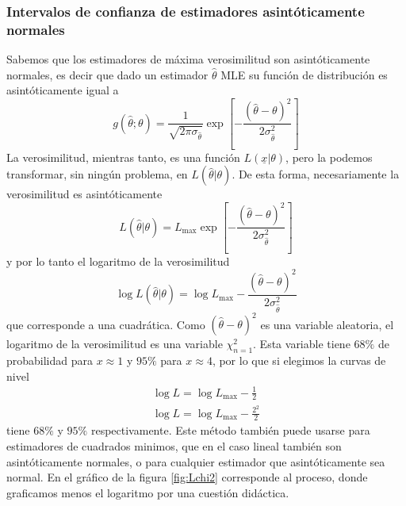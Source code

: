 \documentclass{article}
\numberwithin{equation}{section} %
\begin{document}
\subsubsection{Intervalos de confianza de estimadores asintóticamente normales}
Sabemos que los estimadores de máxima verosimilitud son asintóticamente normales, es decir que dado un estimador $\hat{\theta}$ MLE su función de distribución es asintóticamente igual a 
\begin{equation}
g(\hat{\theta};\theta) = \frac{1}{\sqrt{2\pi \sigma_{\hat{\theta}}}} \exp\left[-\frac{(\hat{\theta} - \theta)^2}{2\sigma^2_{\hat{\theta}}}\right]
\end{equation}
La verosimilitud, mientras tanto, es una función $L(\underline{x}|\theta)$, pero la podemos transformar, sin ningún problema, en $L(\hat{\theta}|\theta)$. De esta forma, necesariamente la verosimilitud es asintóticamente
\begin{equation}
L(\hat{\theta}|\theta) = L_{\text{max}} \exp\left[- \frac{(\hat{\theta} - \theta)^2}{2 \sigma^2_{\hat{\theta}}}\right]
\end{equation}
y por lo tanto el logaritmo de la verosimilitud
\begin{equation}
\log L(\hat{\theta}|\theta) = \log L_{\text{max}} - \frac{(\hat{\theta} - \theta)^2}{2 \sigma^2_{\hat{\theta}}}
\end{equation}
que corresponde a una cuadrática. Como $(\hat{\theta} - \theta)^2$ es una variable aleatoria, el logaritmo de la verosimilitud es una variable $\chi^2_{n = 1}$. Esta variable tiene $68\%$ de probabilidad para $x \approx 1$ y $95\%$ para $x \approx 4$, por lo que si elegimos la curvas de nivel
\begin{equation}
\begin{gathered}
\log L = \log L_{\text{max}} - \frac{1}{2} \\
\log L = \log L_{\text{max}} - \frac{2^2}{2}
\end{gathered}
\end{equation}
tiene $68\%$ y $95\%$ respectivamente. Este método también puede usarse para estimadores de cuadrados minimos, que en el caso lineal también son asintóticamente normales, o para cualquier estimador que asintóticamente sea normal. En el gráfico de la figura \ref{fig:Lchi2} corresponde al proceso, donde graficamos menos el logaritmo por una cuestión didáctica.
\end{document}
